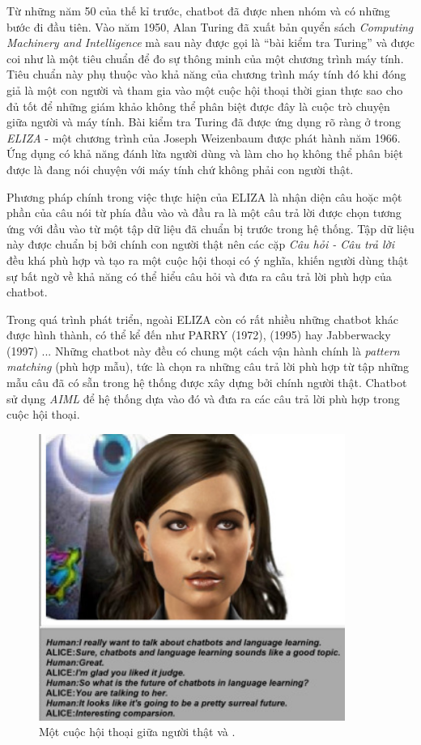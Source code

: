 \documentclass[12pt]{report}
\begin{document}
Từ những năm 50 của thế kỉ trước, chatbot đã được nhen nhóm và có những bước đi đầu tiên. Vào năm 1950, Alan Turing đã xuất bản quyển sách \textit{Computing Machinery and Intelligence} mà sau này được gọi là ``bài kiểm tra Turing'' và được coi như là một tiêu chuẩn để đo sự thông minh của một chương trình máy tính. Tiêu chuẩn này phụ thuộc vào khả năng của chương trình máy tính đó khi đóng giả là một con người và tham gia vào một cuộc hội thoại thời gian thực sao cho đủ tốt để những giám khảo không thể phân biệt được đây là cuộc trò chuyện giữa người và máy tính. Bài kiểm tra Turing đã được ứng dụng rõ ràng ở trong \textit{ELIZA} - một chương trình của Joseph Weizenbaum được phát hành năm 1966. Ứng dụng có khả năng đánh lừa người dùng và làm cho họ không thể phân biệt được là đang nói chuyện với máy tính chứ không phải con người thật.

Phương pháp chính trong việc thực hiện của ELIZA là nhận diện câu hoặc một phần của câu nói từ phía đầu vào và đầu ra là một câu trả lời được chọn tương ứng với đầu vào từ một tập dữ liệu đã chuẩn bị trước trong hệ thống. Tập dữ liệu này được chuẩn bị bởi chính con người thật nên các cặp \textit{Câu hỏi - Câu trả lời} đều khá phù hợp và tạo ra một cuộc hội thoại có ý nghĩa, khiến người dùng thật sự bất ngờ về khả năng có thể hiểu câu hỏi và đưa ra câu trả lời phù hợp của chatbot.

Trong quá trình phát triển, ngoài ELIZA còn có rất nhiều những chatbot khác được hình thành, có thể kể đến như PARRY (1972), \alice{} (1995) hay Jabberwacky (1997) ... Những chatbot này đều có chung một cách vận hành chính là \textit{pattern matching} (phù hợp mẫu), tức là chọn ra những câu trả lời phù hợp từ tập những mẫu câu đã có sẵn trong hệ thống được xây dựng bởi chính người thật. Chatbot \alice{} sử dụng \textit{AIML} để hệ thống dựa vào đó và đưa ra các câu trả lời phù hợp trong cuộc hội thoại.

\begin{figure}[H]
  \centering
    \includegraphics[width=10cm]{Pics/Chap1/alice.jpg}
  \caption{Một cuộc hội thoại giữa người thật và \alice{}\cite{alice-chatbot}.}
\end{figure}
\end{document}
